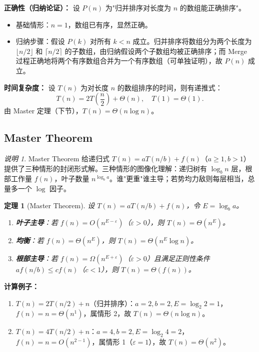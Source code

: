 \documentclass[UTF8,openany,12pt]{ctexbook}
\newtheorem{theorem}{定理}[chapter]
\theoremstyle{remark}
\newtheorem{remark}{说明}[chapter]
\begin{document}
\textbf{正确性（归纳论证）：} 设 $P(n)$ 为"归并排序对长度为 $n$ 的数组能正确排序"。
\begin{itemize}
  \item 基础情形：$n=1$，数组已有序，显然正确。
  \item 归纳步骤：假设 $P(k)$ 对所有 $k < n$ 成立。归并排序将数组分为两个长度为 $\lfloor n/2 \rfloor$ 和 $\lceil n/2 \rceil$ 的子数组，由归纳假设两个子数组均被正确排序；而 Merge 过程正确地将两个有序数组合并为一个有序数组（可单独证明），故 $P(n)$ 成立。
\end{itemize}

\textbf{时间复杂度：} 设 $T(n)$ 为对长度 $n$ 的数组排序的时间，则有递推式：
\[
  T(n) = 2T\!\left(\frac{n}{2}\right) + \Theta(n), \quad T(1) = \Theta(1).
\]
由 Master 定理（下节），$T(n) = \Theta(n \log n)$。

\subsection{Master Theorem}

\begin{remark}
Master Theorem 给递归式 $T(n) = aT(n/b) + f(n)$（$a \geq 1, b > 1$）提供了三种情形的封闭形式解。三种情形的图像化理解：递归树有 $\log_b n$ 层，根部工作量 $f(n)$，叶子数量 $n^{\log_b a}$。谁"更重"谁主导；若势均力敌则每层相当，总量多一个 $\log$ 因子。
\end{remark}

\begin{theorem}[Master Theorem]
设 $T(n) = aT(n/b) + f(n)$，令 $E = \log_b a$。
\begin{enumerate}
  \item \textbf{叶子主导}：若 $f(n) = O(n^{E-\varepsilon})$（$\varepsilon > 0$），则 $T(n) = \Theta(n^E)$。
  \item \textbf{均衡}：若 $f(n) = \Theta(n^E)$，则 $T(n) = \Theta(n^E \log n)$。
  \item \textbf{根部主导}：若 $f(n) = \Omega(n^{E+\varepsilon})$（$\varepsilon > 0$）且满足正则性条件 $af(n/b) \leq cf(n)$（$c < 1$），则 $T(n) = \Theta(f(n))$。
\end{enumerate}
\end{theorem}

\textbf{计算例子：}

\begin{enumerate}
  \item $T(n) = 2T(n/2) + n$（归并排序）：$a=2, b=2, E = \log_2 2 = 1$，$f(n) = n = \Theta(n^1)$，属情形 2，故 $T(n) = \Theta(n \log n)$。
  \item $T(n) = 4T(n/2) + n$：$a=4, b=2, E = \log_2 4 = 2$，$f(n) = n = O(n^{2-1})$，属情形 1（$\varepsilon=1$），故 $T(n) = \Theta(n^2)$。
\end{enumerate}
\end{document}
